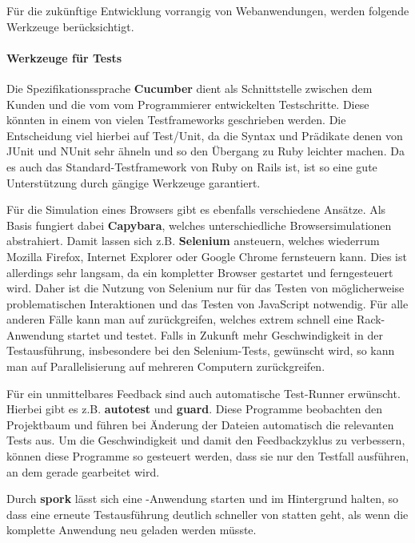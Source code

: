 Für die zukünftige Entwicklung vorrangig von Webanwendungen, werden folgende Werkzeuge berücksichtigt.

\paragraph{Werkzeuge für Tests} Die Spezifikationssprache \textbf{Cucumber} dient als Schnittstelle zwischen dem Kunden und die vom vom Programmierer entwickelten Testschritte. Diese könnten in einem von vielen Testframeworks geschrieben werden. Die Entscheidung viel hierbei auf Test/Unit, da die Syntax und Prädikate denen von JUnit und NUnit sehr ähneln und so den Übergang zu Ruby leichter machen. Da es auch das Standard-Testframework von Ruby on Rails ist, ist so eine gute Unterstützung durch gängige Werkzeuge garantiert.

Für die Simulation eines Browsers gibt es ebenfalls verschiedene Ansätze. Als Basis fungiert dabei \textbf{Capybara}, welches unterschiedliche Browsersimulationen abstrahiert. Damit lassen sich z.B. \textbf{Selenium} ansteuern, welches wiederrum Mozilla Firefox, Internet Explorer oder Google Chrome fernsteuern kann. Dies ist allerdings sehr langsam, da ein kompletter Browser gestartet und ferngesteuert wird. Daher ist die Nutzung von Selenium nur für das Testen von möglicherweise problematischen Interaktionen und das Testen von JavaScript notwendig. Für alle anderen Fälle kann man auf \textbf{} zurückgreifen, welches extrem schnell eine Rack-Anwendung startet und testet.
Falls in Zukunft mehr Geschwindigkeit in der Testausführung, insbesondere bei den Selenium-Tests, gewünscht wird, so kann man auf Parallelisierung auf mehreren Computern zurückgreifen.

Für ein unmittelbares Feedback sind auch automatische Test-Runner erwünscht. Hierbei gibt es z.B. \textbf{autotest} und \textbf{guard}. Diese Programme beobachten den Projektbaum und führen bei Änderung der Dateien automatisch die relevanten Tests aus. Um die Geschwindigkeit und damit den Feedbackzyklus zu verbessern, können diese Programme so gesteuert werden, dass sie nur den Testfall ausführen, an dem gerade gearbeitet wird.

Durch \textbf{spork} lässt sich eine -Anwendung starten und im Hintergrund halten, so dass eine erneute Testausführung deutlich schneller von statten geht, als wenn die komplette Anwendung neu geladen werden müsste.


